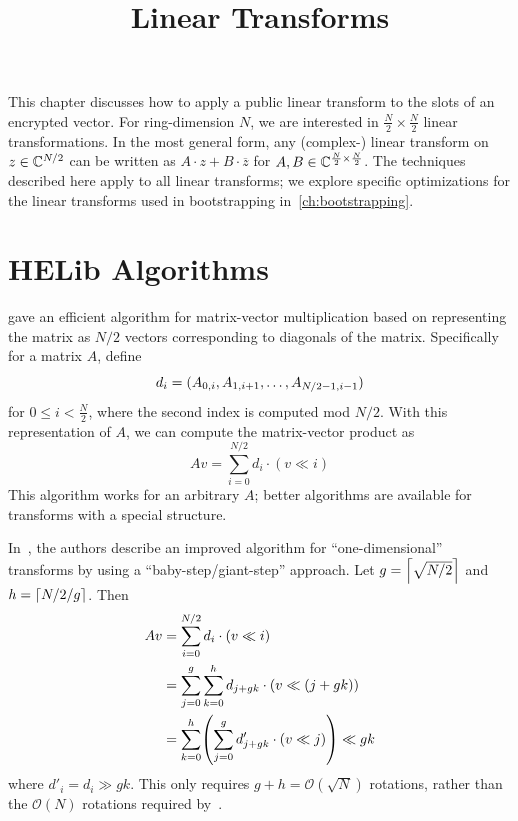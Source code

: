 \documentclass[../fheimpl.tex]{subfiles}
\begin{document}
    \ifcompileasbook
    \else
    \title{Linear Transforms}
	\hypersetup{pageanchor=false}
	\maketitle
	\listoffixmes
	\tableofcontents
	\compileasbooktrue
	\hypersetup{pageanchor=true}
    \fi
	
	This chapter discusses how to apply a public linear transform to the slots of an encrypted vector. For ring-dimension $N$, we are interested in $\frac{N}{2}\times\frac{N}{2}$ linear transformations. In the most general form, any (complex-) linear transform on $z\in \C^{N/2}$ can be written as $A\cdot z+B\cdot \overline{z}$ for $A,B\in\C^{\frac{N}{2}\times\frac{N}{2}}$. The techniques described here apply to all linear transforms; we explore specific optimizations for the linear transforms used in bootstrapping in~\cref{ch:bootstrapping}.
	
	\section{HELib Algorithms}
	\label{sec:helibmatmulalgs}
	\cite{cryptoeprint:2014/106} gave an efficient algorithm for matrix-vector multiplication based on representing the matrix as $N/2$ vectors corresponding to diagonals of the matrix. Specifically for a matrix $A$, define 
	\[d_i = \parens{A_{0, i}, A_{1, i+1}, \ldots, A_{N/2-1, i-1}}\]
	for $0\le i < \frac{N}{2}$, where the second index is computed mod $N/2$. With this representation of $A$, we can compute the matrix-vector product as
	\[Av = \sum_{i=0}^{N/2} d_i\cdot (v \ll i)\]
	This algorithm works for an arbitrary $A$; better algorithms are available for transforms with a special structure.
	
	In~\cite{cryptoeprint:2018/244}, the authors describe an improved algorithm for ``one-dimensional'' transforms by using a ``baby-step/giant-step'' approach. Let $g=\ceil*{\sqrt{N/2}}$ and $h=\ceil*{N/2/g}$. Then
	\begin{align*}
		Av &= \sum_{i=0}^{N/2} d_i\cdot (v \ll i) \\
		   &= \sum_{j=0}^g\sum_{k=0}^h d_{j+gk}\cdot  (v \ll (j+gk)) \\
		   &= \sum_{k=0}^h\parens*{\sum_{j=0}^g d'_{j+gk}\cdot (v \ll j)}\ll gk
	\end{align*}
	where $d'_i = d_i \gg gk$. This only requires $g+h = \mathcal{O}(\sqrt{N})$ rotations, rather than the $\mathcal{O}(N)$ rotations required by~\cite{cryptoeprint:2014/106}.
	
\end{document}
